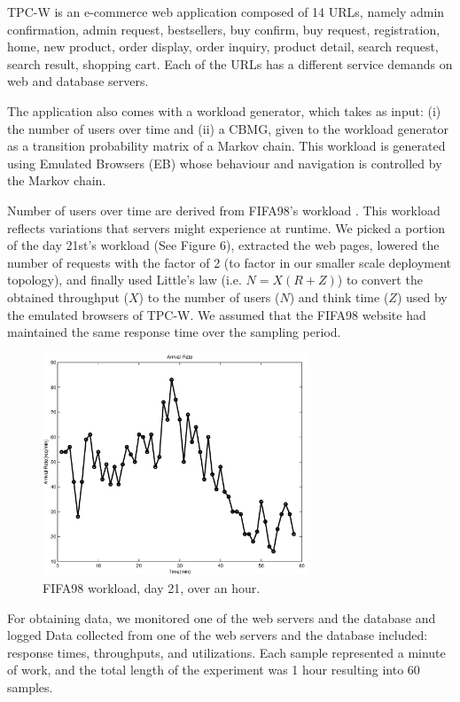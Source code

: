 TPC-W is an e-commerce web application composed of 14 URLs, namely admin confirmation, admin request, bestsellers, buy confirm, buy request, registration, home, new product, order display, order inquiry, product detail, search request, search result, shopping cart. Each of the URLs has a different service demands on web and database servers. 

 The application also comes with a workload generator, which takes as input: (i) the number of users over time and (ii) a CBMG, given to the workload generator as  a transition probability  matrix of a Markov chain. This workload is generated using Emulated Browsers (EB) whose behaviour and navigation is controlled by the Markov chain.  

Number of users over time are derived from FIFA98's workload \cite{arlitt_workload_2000}. This workload reflects variations that servers might experience at runtime. We picked a portion of the day 21st's workload (See Figure 6), extracted the web pages, lowered the number of requests with the factor of 2 (to factor in our smaller scale deployment topology), and finally used Little's law \cite{little1961proof}  (i.e. $N=X(R+Z)$) to convert the obtained throughput ($X$) to the number of users ($N$) and think time ($Z$) used by the emulated browsers of TPC-W. We assumed that the FIFA98 website had maintained the same response time over the sampling period. %

 \begin{figure}[hp]
	\centering
		\includegraphics[width=0.7\textwidth]{image/workload-arr-rate.eps}
	\caption[FIFA98 workload, day 21, over an hour, used in demonstration of the estimation algorithm.]{FIFA98 workload, day 21, over an hour.}
	\label{fig:fig2}
\end{figure}
For obtaining data, we monitored one of the web servers and the database and logged 
Data collected from one of the web servers and the database included: response times, throughputs, and utilizations. Each sample represented a minute of work, and the total length of the experiment was 1 hour resulting into 60 samples.

